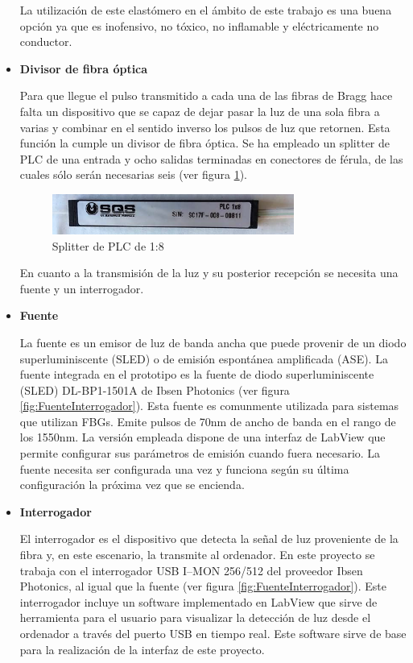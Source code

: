 \begin{itemize}
	La utilización de este elastómero en el ámbito de este trabajo es una buena opción ya que es inofensivo, no tóxico, no inflamable y eléctricamente no conductor.\cite{nedomaPDMS}
	



\item \textbf{Divisor de fibra óptica}

Para que llegue el pulso transmitido a cada una de las fibras de Bragg hace falta un dispositivo que se capaz de dejar pasar la luz de una sola fibra a varias y combinar en el sentido inverso los pulsos de luz que retornen. Esta función la cumple un divisor de fibra óptica. Se ha empleado un splitter de PLC de una entrada y ocho salidas terminadas en conectores de férula, de las cuales sólo serán necesarias seis (ver figura \ref{fig:splitter}).

\begin{figure}[H]
	\centering
	\includegraphics[width=0.75\textwidth]{./img/splitter1a8}
	\caption{Splitter de PLC de 1:8} \label{fig:splitter}
\end{figure}

En cuanto a la transmisión de la luz y su posterior recepción se necesita una fuente y un interrogador. 

\item \textbf{Fuente}

La fuente es un emisor de luz de banda ancha que puede provenir de un diodo superluminiscente (SLED) o de emisión espontánea amplificada (ASE).  La fuente integrada en el prototipo es la fuente de diodo superluminiscente (SLED) DL-BP1-1501A de Ibsen Photonics (ver figura \ref{fig:FuenteInterrogador}). Esta fuente es comunmente utilizada para sistemas que utilizan FBGs. Emite pulsos de 70nm de ancho de banda en el rango de los 1550nm. La versión empleada dispone de una interfaz de LabView que permite configurar sus parámetros de emisión cuando fuera necesario. La fuente necesita ser configurada una vez y funciona según su última configuración la próxima vez que se encienda. 


\item \textbf{Interrogador}


El interrogador es el dispositivo que detecta la señal de luz proveniente de la fibra y, en este escenario, la transmite al ordenador. En este proyecto se trabaja con el interrogador USB I–MON 256/512 del proveedor Ibsen Photonics, al igual que la fuente (ver figura \ref{fig:FuenteInterrogador}). Este interrogador incluye un software implementado en LabView que sirve de herramienta para el usuario para visualizar la detección de luz desde el ordenador a través del puerto USB en tiempo real.  Este software sirve de base para la realización de la interfaz de este proyecto. 


\end{itemize}
